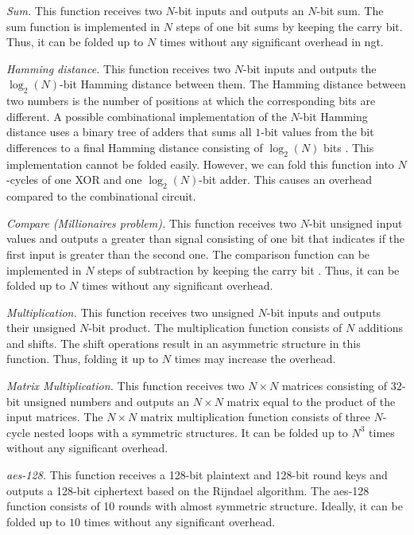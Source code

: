 \textit{Sum.} This function receives two $N$-bit inputs and outputs an $N$-bit sum.
The sum function is implemented in $N$ steps of one bit sums by keeping the carry bit.
Thus, it can be folded up to $N$ times without any significant overhead in \acrfull{ngt}.

\textit{Hamming distance.} This function receives two $N$-bit inputs and outputs the $\log_2(N)$-bit Hamming distance between them.
The Hamming distance between two numbers is the number of positions at which the corresponding bits are different.
A possible combinational implementation of the $N$-bit Hamming distance uses a binary tree of adders that sums all $1$-bit values from the bit differences to a final Hamming distance consisting of $\log_2(N)$ bits \cite{boyar2006concrete}.
This implementation cannot be folded easily.
However, we can fold this function into $N$-cycles of one XOR and one $\log_2(N)$-bit adder.
This causes an overhead compared to the combinational circuit.

\textit{Compare (Millionaires problem).} This function receives two $N$-bit unsigned input values and outputs a greater than signal consisting of one bit that indicates if the first input is greater than the second one.
The comparison function can be implemented in $N$ steps of subtraction by keeping the carry bit \cite{kolesnikov2009improved}.
Thus, it can be folded up to $N$ times without any significant overhead.

\textit{Multiplication.} This function receives two unsigned $N$-bit inputs and outputs their unsigned $N$-bit product.
The multiplication function consists of $N$ additions and shifts.
The shift operations result in an asymmetric structure in this function.
Thus, folding it up to $N$ times may increase the overhead.

\textit{Matrix Multiplication.} This function receives two $N\times N$ matrices consisting of $32$-bit unsigned numbers and outputs an $N\times N$ matrix equal to the product of the input matrices.
The $N\times N$ matrix multiplication function consists of three $N$-cycle nested loops with a symmetric structures.
It can be folded up to $N^3$ times without any significant overhead.

\textit{\acrshort{aes}-128.} This function receives a 128-bit plaintext and 128-bit round keys and outputs a 128-bit ciphertext based on the Rijndael algorithm.
The \acrshort{aes}-128 function consists of 10 rounds with almost symmetric structure.
Ideally, it can be folded up to $10$ times without any significant overhead.

